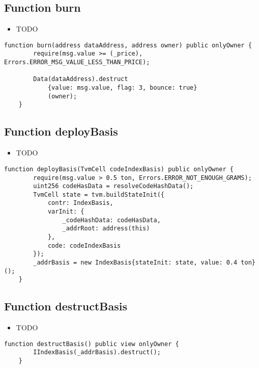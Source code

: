 \subsection{Function burn}

\begin{itemize}
\item TODO
\end{itemize}

\begin{lstlisting}[firstnumber=123]
    function burn(address dataAddress, address owner) public onlyOwner {
        require(msg.value >= (_price), Errors.ERROR_MSG_VALUE_LESS_THAN_PRICE);

        Data(dataAddress).destruct
            {value: msg.value, flag: 3, bounce: true}
            (owner);
    }
\end{lstlisting}

\subsection{Function deployBasis}

\begin{itemize}
\item TODO
\end{itemize}

\begin{lstlisting}[firstnumber=85]
    function deployBasis(TvmCell codeIndexBasis) public onlyOwner {
        require(msg.value > 0.5 ton, Errors.ERROR_NOT_ENOUGH_GRAMS);
        uint256 codeHasData = resolveCodeHashData();
        TvmCell state = tvm.buildStateInit({
            contr: IndexBasis,
            varInit: {
                _codeHashData: codeHasData,
                _addrRoot: address(this)
            },
            code: codeIndexBasis
        });
        _addrBasis = new IndexBasis{stateInit: state, value: 0.4 ton}();
    }
\end{lstlisting}

\subsection{Function destructBasis}

\begin{itemize}
\item TODO
\end{itemize}

\begin{lstlisting}[firstnumber=99]
    function destructBasis() public view onlyOwner {
        IIndexBasis(_addrBasis).destruct();
    }
\end{lstlisting}

